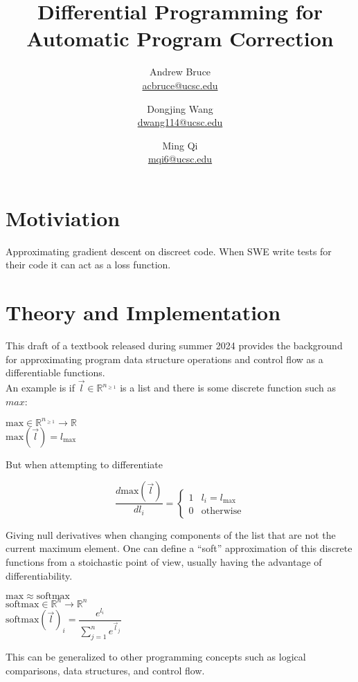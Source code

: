 \documentclass{article}
\title{Differential Programming for Automatic Program Correction}
\author{Andrew Bruce \\ \href{mailto:acbruce@ucsc.edu}{acbruce@ucsc.edu}
  \and Dongjing Wang \\ \href{mailto:dwang114@ucsc.edu}{dwang114@ucsc.edu}
  \and Ming Qi \\ \href{mailto:mqi6@ucsc.edu}{mqi6@ucsc.edu} }
\begin{document}
\maketitle
\section*{Motiviation}
Approximating gradient descent on discreet code. When SWE write tests for their code it can act as a loss function.

\section*{Theory and Implementation}
This draft of a textbook \cite{blondel2024elementsdifferentiableprogramming} released during summer 2024 provides the background for approximating program data structure operations and control flow as a differentiable functions.\\
An example is if $\vec{l} \in \mathbb{R}^{n_{\ge 1}}$ is a list and there is some discrete function such as $max$:
\begin{center}
  $\mathrm{max} \in \mathbb{R}^{n_{\ge 1}} \rightarrow \mathbb{R}$\\
  $\mathrm{max}(\vec{l}) = l_{\mathrm{max}}$
\end{center}
But when attempting to differentiate
\begin{center}
  $$\dfrac{d \mathrm{max}(\vec{l})}{dl_i} = \left\{
  \begin{array}{ll}
    1 & l_i = l_{\mathrm{max}} \\
    0 & \mathrm{otherwise}
  \end{array} 
  \right.$$
\end{center}
Giving null derivatives when changing components of the list that are not the current maximum element.
One can define a ``soft'' approximation of this discrete functions from a stoichastic point of view, usually having the advantage of differentiability.
\begin{center}
  $\mathrm{max} \approx \mathrm{softmax}$\\
  $\mathrm{softmax} \in \mathbb{R}^n \rightarrow \mathbb{R}^n$\\
  $\mathrm{softmax}(\vec{l})_i = \dfrac{e^{l_i}}{\sum_{j=1}^n e^{\vec{l}_j}}$\\
\end{center}
This can be generalized to other programming concepts such as logical comparisons, data structures, and control flow.
\end{document}
